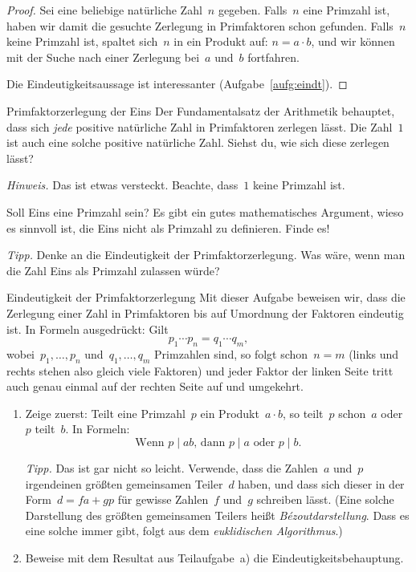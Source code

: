 \documentclass[twoside]{../zirkelblatt1415}
\theoremstyle{definition}
\theoremstyle{plain}
\theoremstyle{remark}
\begin{document}
\begin{proof}Sei eine beliebige natürliche Zahl~$n$ gegeben. Falls~$n$ eine
Primzahl ist, haben wir damit die gesuchte Zerlegung in Primfaktoren schon
gefunden. Falls~$n$ keine Primzahl ist, spaltet sich~$n$ in ein Produkt auf: $n
= a \cdot b$, und wir können mit der Suche nach einer Zerlegung bei~$a$ und~$b$
fortfahren.

Die Eindeutigkeitsaussage ist interessanter (Aufgabe~\ref{aufg:eindt}).\end{proof}

\begin{aufgabe}{Primfaktorzerlegung der Eins}
Der Fundamentalsatz der Arithmetik behauptet, dass sich \emph{jede} positive
natürliche Zahl in Primfaktoren zerlegen lässt. Die Zahl~$1$ ist auch eine
solche positive natürliche Zahl. Siehst du, wie sich diese zerlegen lässt?

\emph{Hinweis.} Das ist etwas versteckt. Beachte, dass~$1$ keine Primzahl ist.
\end{aufgabe}

\begin{aufgabe}{Soll Eins eine Primzahl sein?}
Es gibt ein gutes mathematisches Argument, wieso es sinnvoll ist, die Eins
nicht als Primzahl zu definieren. Finde es!

\emph{Tipp.} Denke an die Eindeutigkeit der Primfaktorzerlegung. Was wäre, wenn
man die Zahl Eins als Primzahl zulassen würde?
\end{aufgabe}

\begin{aufgabe}{Eindeutigkeit der Primfaktorzerlegung}\label{aufg:eindt}
Mit dieser Aufgabe beweisen wir, dass die Zerlegung einer Zahl in Primfaktoren
bis auf Umordnung der Faktoren eindeutig ist. In Formeln ausgedrückt: Gilt
\[ p_1 \cdots p_n = q_1 \cdots q_m, \]
wobei~$p_1,\ldots,p_n$ und~$q_1,\ldots,q_m$ Primzahlen sind, so folgt schon~$n
= m$ (links und rechts stehen also gleich viele Faktoren) und jeder Faktor der
linken Seite tritt auch genau einmal auf der rechten Seite auf und umgekehrt.

\begin{enumerate}
\item Zeige zuerst: Teilt eine Primzahl~$p$ ein Produkt~$a \cdot b$, so
teilt~$p$ schon~$a$ oder~$p$ teilt~$b$. In Formeln:
\[ \text{Wenn $p \mid ab$, dann $p \mid a$ oder $p \mid b$.} \]

\emph{Tipp.} Das ist gar nicht so leicht. Verwende, dass die Zahlen~$a$ und~$p$
irgendeinen größten gemeinsamen Teiler~$d$ haben, und dass sich dieser in der
Form~$d = fa + gp$ für gewisse Zahlen~$f$ und~$g$ schreiben lässt. (Eine solche
Darstellung des größten gemeinsamen Teilers heißt \emph{Bézoutdarstellung}.
Dass es eine solche immer gibt, folgt aus dem \emph{euklidischen Algorithmus}.)

\item Beweise mit dem Resultat aus Teilaufgabe~a) die Eindeutigkeitsbehauptung.
\end{enumerate}\fixlistspacing
\end{aufgabe}
\end{document}
